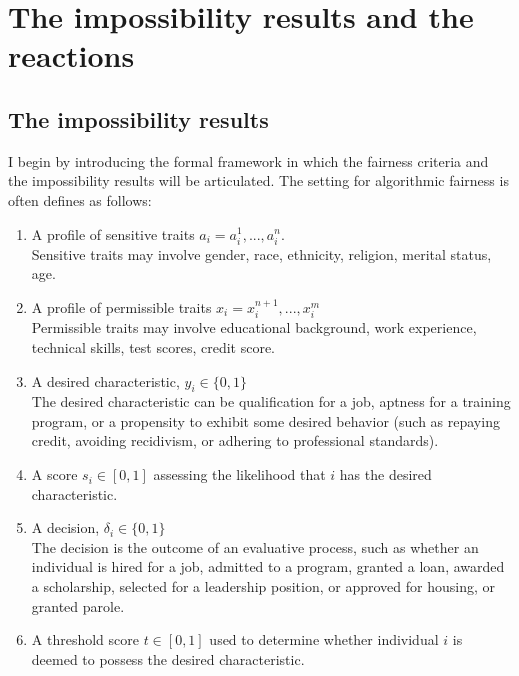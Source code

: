\documentclass{article}
\begin{document}
\section{The impossibility results and the reactions}
\subsection{The impossibility results}

I begin by introducing the formal framework in which the fairness criteria and the impossibility results will be articulated. The setting for algorithmic fairness is often defines as follows:

\begin{enumerate}
  \item A profile of sensitive traits $a_i = {a_i^1,..., a_i^n}$. \\
  Sensitive traits may involve gender, race, ethnicity, religion, merital status, age.    
   \item A profile of permissible traits $x_i = {x_i^{n+1},..., x_i^m}$ \\
   Permissible traits may involve educational background, work experience, technical skills, test scores, credit score.
    \item A desired characteristic, $y_i \in \{0, 1\}$  \\
    The desired characteristic can be qualification for a job, aptness for a training program, or a propensity to exhibit some desired behavior (such as repaying credit, avoiding recidivism, or adhering to professional standards). 
    \item A score  $s_i \in [0, 1]$ assessing the likelihood that $i$ has the desired characteristic. 
    \item A decision, $\delta_i \in \{0, 1\}$  \\
    The decision is the outcome of an evaluative process, such as whether an individual is hired for a job, admitted to a program, granted a loan, awarded a scholarship, selected for a leadership position, or approved for housing, or granted parole. 
    \item A threshold score $t \in [0, 1]$ used to determine whether individual $i$ is deemed to possess the desired characteristic.
\end{enumerate}
\end{document}
